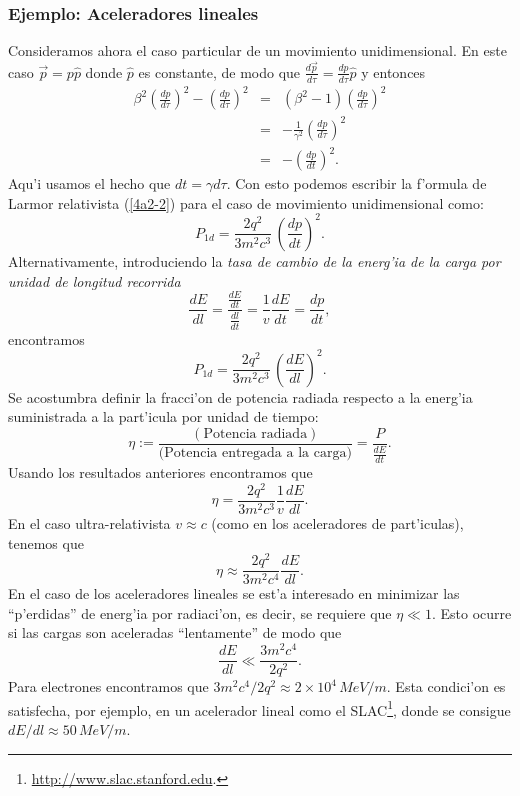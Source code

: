 \subsubsection{Ejemplo: Aceleradores lineales}
Consideramos ahora el caso particular de un movimiento unidimensional. En este
caso $\vec{p}=p\hat{p}$ donde $\hat{p}$ es constante, de modo que
$\frac{d\vec{p}}{d\tau}=\frac{dp}{d\tau}\hat{p}$ y entonces
\begin{eqnarray}
\beta^2\left(\frac{dp}{d\tau}\right)^2-\left( \frac{dp}{d\tau}\right)^2
&=&\left( \beta^2-1\right) \left(  \frac{dp}{d\tau}\right)^2\\
&=&-\frac{1}{\gamma^2} \left(  \frac{dp}{d\tau}\right)^2\\
&=&-\left(\frac{dp}{dt}\right)^2.
\end{eqnarray}
Aqu'i usamos el hecho que $dt=\gamma d\tau$. Con esto podemos escribir la f'ormula de Larmor relativista (\ref{4a2-2}) para el caso de movimiento unidimensional como:
\begin{equation}
\boxed{P_{1d}=\frac{2q^2}{3m^2c^3}\,\left(  \frac{dp}{dt}\right)^2.}
\end{equation}
Alternativamente, introduciendo la \textit{tasa de cambio de la energ'ia de la
carga por unidad de longitud recorrida}
\begin{equation}
 \frac{dE}{dl}=\frac{\frac{dE}{dt}}{\frac{dl}{dt}}=\frac{1}{v}\frac{dE}{dt}
= \frac{dp}{dt},
\end{equation}
encontramos
\begin{equation}
\boxed{P_{1d}=\frac{2q^2}{3m^2c^3}\,\left(  \frac{dE}{dl}\right)^2.}%
\end{equation}
Se acostumbra definir la fracci'on de potencia radiada respecto a la energ'ia
suministrada a la part'icula por unidad de tiempo:
\begin{equation}
\eta:=\frac{\left( \text{Potencia radiada}\right) }{\text{(Potencia entregada a
la carga)}}=\frac{P}{\frac{dE}{dt}}.
\end{equation}
Usando los resultados anteriores encontramos que
\begin{equation}
\eta=\frac{2q^2}{3m^2c^3}\frac{1}{v}\frac{dE}{dl}.
\end{equation}
En el caso ultra-relativista $v\approx c$ (como en los aceleradores de
part'iculas), tenemos que
\begin{equation}
\eta\approx\frac{2q^2}{3m^2c^4}\frac{dE}{dl}.
\end{equation}
En el caso de los aceleradores lineales se est'a interesado en minimizar las
``p'erdidas'' de energ'ia por radiaci'on, es decir, se requiere que $\eta\ll 1$.
Esto ocurre si las cargas son aceleradas ``lentamente'' de modo que
\begin{equation}
\frac{dE}{dl}\ll \frac{3m^2c^4}{2q^2}.
\end{equation}
Para electrones encontramos que ${3m^2c^4}/{2q^2}\approx 2\times 10^4\, 
MeV/m$. Esta condici'on es satisfecha, por ejemplo, en un acelerador lineal como
el SLAC\footnote{\url{http://www.slac.stanford.edu}.}, donde se consigue
${dE}/{dl}\approx 50\, MeV/m$.

